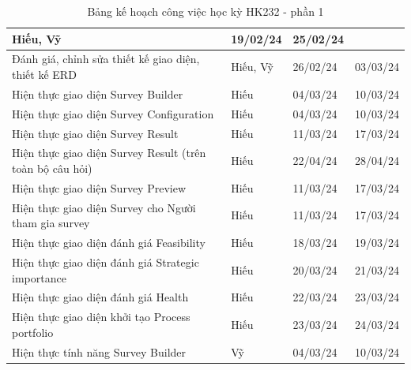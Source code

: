 \begin{table}[H]
{\begin{tabular}{|p{11cm}|p{1.75cm}|p{1.5cm}|p{1.5cm}|}
        { Hiếu, Vỹ} &
        { 19/02/24} &
        { 25/02/24} \\ \hline
        { Đánh giá, chỉnh sửa thiết kế giao diện, thiết kế ERD} &
        { Hiếu, Vỹ} &
        { 26/02/24} &
        { 03/03/24} \\ \hline
        { Hiện thực giao diện Survey Builder} &
        { Hiếu} &
        { 04/03/24} &
        { 10/03/24} \\ \hline
        { Hiện thực giao diện Survey Configuration} &
        { Hiếu} &
        { 04/03/24} &
        { 10/03/24} \\ \hline
        { Hiện thực giao diện Survey Result} &
        { Hiếu} &
        { 11/03/24} &
        { 17/03/24} \\ \hline
        { Hiện thực giao diện Survey Result (trên toàn bộ câu hỏi)} &
        { Hiếu} &
        { 22/04/24} &
        { 28/04/24} \\ \hline{ Hiện thực giao diện Survey Preview} &
        { Hiếu} &
        { 11/03/24} &
        { 17/03/24} \\ \hline
        { Hiện thực giao diện Survey cho Người tham gia survey} &
        { Hiếu} &
        { 11/03/24} &
        { 17/03/24} \\ \hline
        { Hiện thực giao diện đánh giá Feasibility} &
        { Hiếu} &
        { 18/03/24} &
        { 19/03/24} \\ \hline
        { Hiện thực giao diện đánh giá Strategic importance} &
        { Hiếu} &
        { 20/03/24} &
        { 21/03/24} \\ \hline
        { Hiện thực giao diện đánh giá Health} &
        { Hiếu} &
        { 22/03/24} &
        { 23/03/24} \\ \hline
        { Hiện thực giao diện khởi tạo Process portfolio} &
        { Hiếu} &
        { 23/03/24} &
        { 24/03/24} \\ \hline
        { Hiện thực tính năng Survey Builder} &
        { Vỹ} &
        { 04/03/24} &
        { 10/03/24} \\ \hline
    \end{tabular}%
    }
    \caption{Bảng kế hoạch công việc học kỳ HK232 - phần 1}
\end{table}

